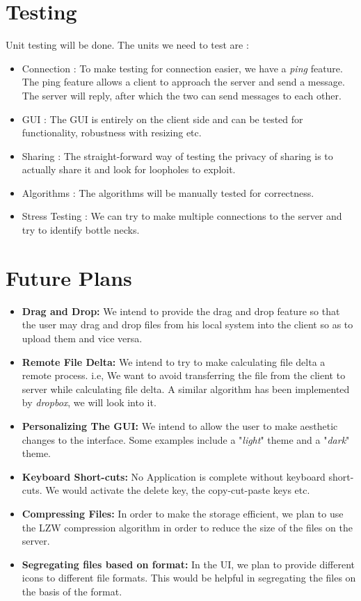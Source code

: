 \documentclass[]{article}
\begin{document}
\section{\LARGE Testing}
Unit testing will be done. The units we need to test are :
\begin{itemize}
\item Connection : To make testing for connection easier, we have a \textit{ping} feature. The ping feature allows a client to approach the server and send a message. The server will reply, after which the two can send messages to each other.
\item GUI : The GUI is entirely on the client side and can be tested for functionality, robustness with resizing etc.
\item Sharing : The straight-forward way of testing the privacy of sharing is to actually share it and look for loopholes to exploit.
\item Algorithms : The algorithms will be manually tested for correctness.
\item Stress Testing : We can try to make multiple connections to the server and try to identify bottle necks.

\end{itemize}
\section{\LARGE Future Plans}

\begin{itemize}
\item \textbf{Drag and Drop:} 
We intend to provide the drag and drop feature so that the user may drag and drop files from his local system into the client so as to upload them and vice versa.
\item \textbf{Remote File Delta:}
We intend to try to make calculating file delta a remote process. i.e, We want to avoid transferring the file from the client to server while calculating file delta. A similar algorithm has been implemented by \textit{dropbox}, we will look into it.
\item \textbf{Personalizing The GUI:}
We intend to allow the user to make aesthetic changes to the interface. Some examples include a "\textit{light}" theme and a "\textit{dark}" theme.
\item \textbf{Keyboard Short-cuts:}
No Application is complete without keyboard short-cuts. We would activate the delete key, the copy-cut-paste keys etc.
\item \textbf{Compressing Files:}
In order to make the storage efficient, we plan to use the LZW compression algorithm in order to reduce the size of the files on the server.
\item \textbf{Segregating files based on format:}
In the UI, we plan to provide different icons to different file formats. This would be helpful in segregating the files on the basis of the format. 
\end{itemize}
\end{document}
